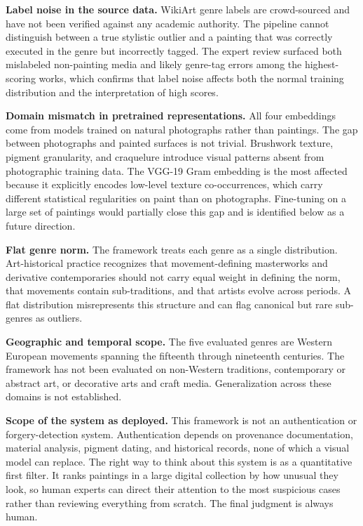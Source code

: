 \documentclass[conference]{IEEEtran}
\begin{document}
\textbf{Label noise in the source data.} WikiArt genre labels are
crowd-sourced and have not been verified against any academic authority. The pipeline cannot distinguish between a true stylistic outlier and a painting that was correctly executed in the genre but incorrectly tagged. The expert review surfaced both mislabeled non-painting media and likely genre-tag errors among the highest-scoring works, which confirms that label noise affects both the normal training distribution and the interpretation of high scores.

\textbf{Domain mismatch in pretrained representations.} All four
embeddings come from models trained on natural photographs rather than paintings. The gap between photographs and painted surfaces is not trivial. Brushwork texture, pigment granularity, and craquelure introduce visual patterns absent from photographic training data. The VGG-19 Gram embedding is the most affected because it explicitly encodes low-level texture co-occurrences, which carry different statistical regularities on paint than on photographs. Fine-tuning on a large set of paintings would partially close this gap and is identified below as a future direction.

\textbf{Flat genre norm.} The framework treats each genre as a
single distribution. Art-historical practice recognizes that movement-defining masterworks and derivative contemporaries should not carry equal weight in defining the norm, that movements contain sub-traditions, and that artists evolve across periods. A flat distribution misrepresents this structure and can flag canonical but rare sub-genres as outliers.

\textbf{Geographic and temporal scope.} The five evaluated genres
are Western European movements spanning the fifteenth through nineteenth centuries. The framework has not been evaluated on non-Western traditions, contemporary or abstract art, or decorative arts and craft media. Generalization across these domains is not established.

\textbf{Scope of the system as deployed.} This framework is not an
authentication or forgery-detection system. Authentication depends on provenance documentation, material analysis, pigment dating, and historical records, none of which a visual model can replace. The right way to think about this system is as a quantitative first filter. It ranks paintings in a large digital collection by how unusual they look, so human experts can direct their attention to the most suspicious cases rather than reviewing everything from scratch. The final judgment is always human.
\end{document}
